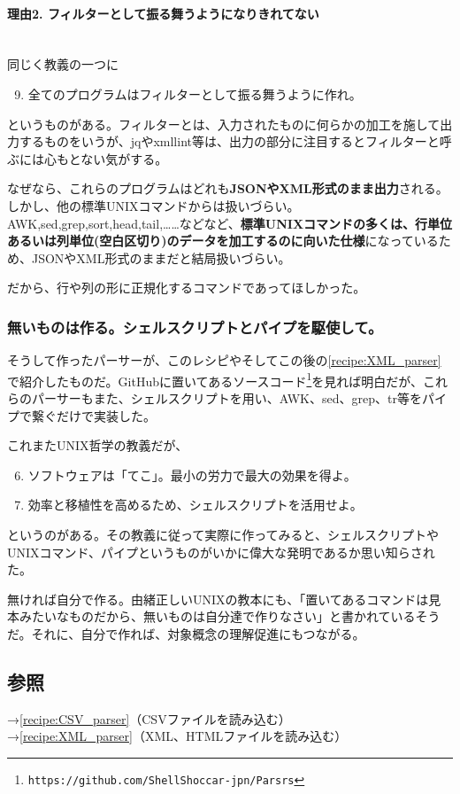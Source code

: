 \paragraph{理由2. フィルターとして振る舞うようになりきれてない}　\\
同じく教義の一つに
\begin{enumerate}
\setcounter{enumi}{8}
  \item 全てのプログラムはフィルターとして振る舞うように作れ。
\end{enumerate}
というものがある。フィルターとは、入力されたものに何らかの加工を施して出力するものをいうが、jqやxmllint等は、出力の部分に注目するとフィルターと呼ぶには心もとない気がする。

なぜなら、これらのプログラムはどれも\textbf{JSONやXML形式のまま出力}される。しかし、他の標準UNIXコマンドからは扱いづらい。AWK,sed,grep,sort,head,tail,……などなど、\textbf{標準UNIXコマンドの多くは、行単位あるいは列単位(空白区切り)のデータを加工するのに向いた仕様}になっているため、JSONやXML形式のままだと結局扱いづらい。

だから、行や列の形に正規化するコマンドであってほしかった。

\subsubsection*{無いものは作る。シェルスクリプトとパイプを駆使して。}

そうして作ったパーサーが、このレシピやそしてこの後の\ref{recipe:XML_parser}で紹介したものだ。GitHubに置いてあるソースコード\footnote{\verb|https://github.com/ShellShoccar-jpn/Parsrs|}を見れば明白だが、これらのパーサーもまた、シェルスクリプトを用い、AWK、sed、grep、tr等をパイプで繋ぐだけで実装した。

これまたUNIX哲学の教義だが、
\begin{enumerate}
\setcounter{enumi}{5}
  \item ソフトウェアは「てこ」。最小の労力で最大の効果を得よ。
  \item 効率と移植性を高めるため、シェルスクリプトを活用せよ。
\end{enumerate}
というのがある。その教義に従って実際に作ってみると、シェルスクリプトやUNIXコマンド、パイプというものがいかに偉大な発明であるか思い知らされた。

無ければ自分で作る。由緒正しいUNIXの教本にも、「置いてあるコマンドは見本みたいなものだから、無いものは自分達で作りなさい」と書かれているそうだ。それに、自分で作れば、対象概念の理解促進にもつながる。

\subsection*{参照}

\noindent
→\ref{recipe:CSV_parser}（CSVファイルを読み込む） \\
→\ref{recipe:XML_parser}（XML、HTMLファイルを読み込む）
